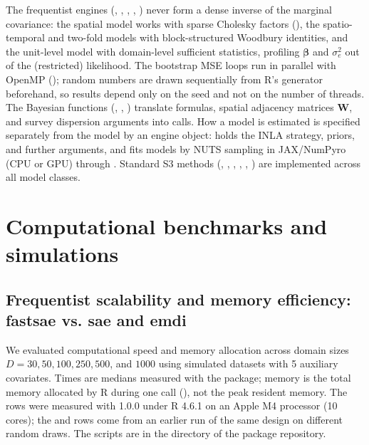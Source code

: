 The frequentist engines (, , , , ) never form a dense inverse of the marginal covariance: the spatial model works with sparse Cholesky factors (), the spatio-temporal and two-fold models with block-structured Woodbury identities, and the unit-level model with domain-level sufficient statistics, profiling \(\bm{\beta}\) and \(\sigma_e^2\) out of the (restricted) likelihood. The bootstrap MSE loops run in parallel with OpenMP (); random numbers are drawn sequentially from R's generator beforehand, so results depend only on the seed and not on the number of threads. The Bayesian functions (, , ) translate formulas, spatial adjacency matrices \(\bm{W}\), and survey dispersion arguments into  calls. How a model is estimated is specified separately from the model by an engine object:  holds the INLA strategy, priors, and further  arguments, and  fits  models by NUTS sampling in JAX/NumPyro (CPU or GPU) through . Standard S3 methods (, , , , , ) are implemented across all model classes.

\section{Computational benchmarks and simulations} \label{sec:simulations}

\subsection{Frequentist scalability and memory efficiency: fastsae vs. sae and emdi}

We evaluated computational speed and memory allocation across domain sizes \(D = 30, 50, 100, 250, 500\), and \(1000\) using simulated datasets with 5 auxiliary covariates. Times are medians measured with the  package; memory is the total memory allocated by R during one call (), not the peak resident memory. The  rows were measured with  1.0.0 under R 4.6.1 on an Apple M4 processor (10 cores); the  and  rows come from an earlier run of the same design on different random draws. The scripts are in the  directory of the package repository.

